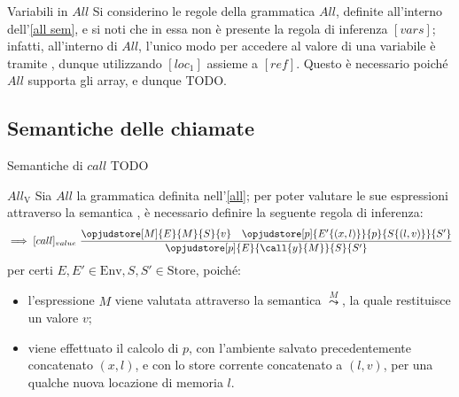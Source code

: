 \documentclass[a4paper, 12pt]{report}
\begin{document}
    \begin{framedobs}{Variabili in $All$}
        Si considerino le regole della grammatica $All$, definite all'interno dell'\cref{all sem}, e si noti che in essa non è presente la regola di inferenza $[vars]$; infatti, all'interno di $All$, l'unico modo per accedere al valore di una variabile è tramite , dunque utilizzando $[loc_1]$ assieme a $[ref]$. Questo è necessario poiché $All$ supporta gli array, e dunque TODO.
    \end{framedobs}

    \subsection{Semantiche delle chiamate}

    \begin{frameddefn}{Semantiche di $call$}
        TODO
    \end{frameddefn}

    \begin{framedprop}[label={all v}]{$All_\mathrm{V}$}
        Sia $All$ la grammatica definita nell'\cref{all}; per poter valutare le sue espressioni attraverso la semantica , è necessario definire la seguente regola di inferenza:  $$\implies [call]_{value} \ \dfrac{\opjudstore[M]{E}{M}{S}{v} \quad \opjudstore[p]{E'\{(x,l)\}}{p}{S\{(l,v)\}}{S'}}{\opjudstore[p]{E}{\call{y}{M}}{S}{S'}}$$ per certi $E, E' \in \mathrm{Env}, S,S' \in \mathrm{Store}$, poiché:

        \begin{itemize}
            \item l'espressione $M$ viene valutata attraverso la semantica $\stackrel{M}{\leadsto}$, la quale restituisce un valore $v$;
            \item viene effettuato il calcolo di $p$, con l'ambiente salvato precedentemente concatenato $(x,l)$, e con lo store corrente concatenato a $(l,v)$, per una qualche nuova locazione di memoria $l$.
        \end{itemize}
    \end{framedprop}
\end{document}
